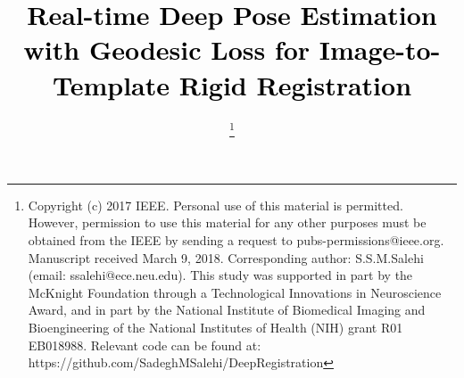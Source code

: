 \documentclass[journal,transmag]{IEEEtran}
\begin{document}
\title{\textcolor{black}{Real-time Deep Pose Estimation with Geodesic Loss for Image-to-Template Rigid Registration}}

\author{

\thanks{Copyright (c) 2017 IEEE. Personal use of this material is permitted. However, permission to use this material for any other purposes must be obtained from the IEEE by sending a request to pubs-permissions@ieee.org. Manuscript received March 9, 2018.
Corresponding author: S.S.M.Salehi (email: ssalehi@ece.neu.edu). This study was supported in part by the McKnight Foundation through a Technological Innovations in Neuroscience Award, and in part by the National Institute of Biomedical Imaging and Bioengineering of the National Institutes of Health (NIH) grant R01 EB018988. Relevant code can be found at: https://github.com/SadeghMSalehi/DeepRegistration}}
\end{document}
